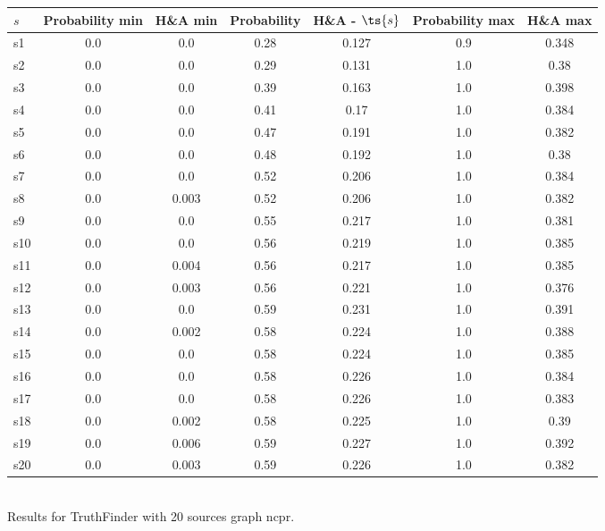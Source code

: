 \documentclass{article}
\begin{document}
\noindent\begin{tabular}{|l|c|c|c|c|c|c|}
\hline
$s$& Probability min & H\&A min & Probability & H\&A - $\ts{s}$ & Probability max & H\&A max\\
\hline
s1 &0.0 & 0.0 & 0.28 & 0.127 & 0.9 & 0.348\\
\hline
s2 &0.0 & 0.0 & 0.29 & 0.131 & 1.0 & 0.38\\
\hline
s3 &0.0 & 0.0 & 0.39 & 0.163 & 1.0 & 0.398\\
\hline
s4 &0.0 & 0.0 & 0.41 & 0.17 & 1.0 & 0.384\\
\hline
s5 &0.0 & 0.0 & 0.47 & 0.191 & 1.0 & 0.382\\
\hline
s6 &0.0 & 0.0 & 0.48 & 0.192 & 1.0 & 0.38\\
\hline
s7 &0.0 & 0.0 & 0.52 & 0.206 & 1.0 & 0.384\\
\hline
s8 &0.0 & 0.003 & 0.52 & 0.206 & 1.0 & 0.382\\
\hline
s9 &0.0 & 0.0 & 0.55 & 0.217 & 1.0 & 0.381\\
\hline
s10 &0.0 & 0.0 & 0.56 & 0.219 & 1.0 & 0.385\\
\hline
s11 &0.0 & 0.004 & 0.56 & 0.217 & 1.0 & 0.385\\
\hline
s12 &0.0 & 0.003 & 0.56 & 0.221 & 1.0 & 0.376\\
\hline
s13 &0.0 & 0.0 & 0.59 & 0.231 & 1.0 & 0.391\\
\hline
s14 &0.0 & 0.002 & 0.58 & 0.224 & 1.0 & 0.388\\
\hline
s15 &0.0 & 0.0 & 0.58 & 0.224 & 1.0 & 0.385\\
\hline
s16 &0.0 & 0.0 & 0.58 & 0.226 & 1.0 & 0.384\\
\hline
s17 &0.0 & 0.0 & 0.58 & 0.226 & 1.0 & 0.383\\
\hline
s18 &0.0 & 0.002 & 0.58 & 0.225 & 1.0 & 0.39\\
\hline
s19 &0.0 & 0.006 & 0.59 & 0.227 & 1.0 & 0.392\\
\hline
s20 &0.0 & 0.003 & 0.59 & 0.226 & 1.0 & 0.382\\
\hline
\end{tabular}\\

\noindent Results for TruthFinder with 20 sources graph ncpr.
\end{document}
